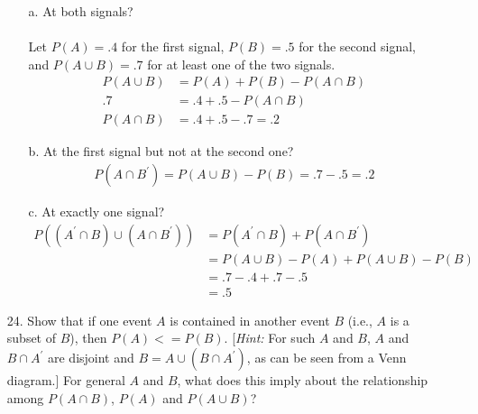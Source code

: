 \documentclass[letterpaper,12pt]{article}
\begin{document}
\begin{enumerate}
  \begin{enumerate}
      \item[a.]
        At both signals?
        \\ \\
        Let $P(A) = .4$ for the first signal, $P(B) = .5$ for the second signal, and $P(A \cup B) = .7$ for at least one of the two signals.
        \begin{align*}
          P(A \cup B) &= P(A) + P(B) - P(A \cap B) \\
          .7 &= .4 + .5 - P(A \cap B) \\
          P(A \cap B) &= .4 + .5 - .7 = .2
        \end{align*}
      \item[b.]
        At the first signal but not at the second one?
        \begin{align*}
          P(A \cap B^\prime) = P(A \cup B) - P(B) = .7 - .5 = .2
        \end{align*}
      \item[c.]
        At exactly one signal?
        \begin{align*}
          P((A^\prime \cap B) \cup (A \cap B^\prime)) &= P(A^\prime \cap B) + P(A \cap B^\prime) \\
          &= P(A \cup B) - P(A) + P(A \cup B) - P(B) \\
          &= .7 - .4 + .7 - .5 \\
          &= .5
        \end{align*}
    \end{enumerate}
  \item[24.]
    Show that if one event $A$ is contained in another event $B$ (i.e., $A$ is a subset of $B$), then $P(A) <= P(B)$. [\textit{Hint:} For such $A$ and $B$, $A$ and $B \cap A^\prime$ are disjoint and $B = A \cup (B \cap A^\prime)$, as can be seen from a Venn diagram.] For general $A$ and $B$, what does this imply about the relationship among $P(A \cap B)$, $P(A)$ and $P(A \cup B)$?
\end{enumerate}
\end{document}
